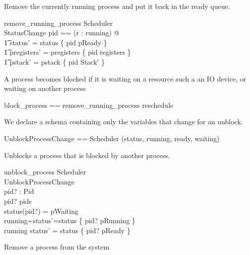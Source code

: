 \documentclass{article}
\begin{document}
Remove the currently running process and put it back in the ready queue.

\begin{schema}{remove\_running\_process}
  \Delta Scheduler\\
  \Xi StatusChange
\where
  \LET pid == (\mu r : running) @\\
    \t1 status' = status \oplus \{ pid \mapsto pReady \} \land\\
    \t1 pregisters' = pregisters \oplus \{ pid \mapsto registers \} \land\\
    \t1 pstack' = pstack \oplus \{ pid \mapsto \theta Stack' \}
\end{schema}

A process becomes blocked if it is waiting on a resource such a an IO
device, or waiting on another process 

\begin{zed}
  block\_process == remove\_running\_process \semi reschedule
\end{zed}

We declare a schema containing only the variables that change for an
unblock.

\begin{zed}
  UnblockProcessChange == Scheduler \hide (status, running, ready, waiting)
\end{zed}

Unblocks a process that is blocked by another process.

\begin{schema}{unblock\_process}
  \Delta Scheduler\\
  \Xi UnblockProcessChange\\
  pid? : Pid\\
\where
  pid? \in pids\\
  status(pid?) = pWaiting\\
  running=\emptyset \iff status'=status \oplus \{ pid? \mapsto pRunning \}\\
  running \neq \emptyset \iff status' = status \oplus \{ pid? \mapsto pReady \}
\end{schema}

Remove a process from the system
\end{document}
